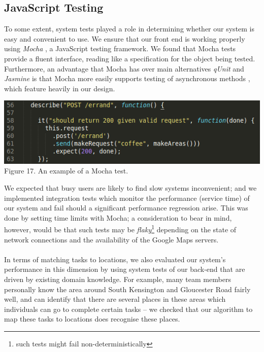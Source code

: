 \documentclass[a4paper, 10pt]{report}
\begin{document}
\subsection{JavaScript Testing}
To some extent, system tests played a role in determining whether our system is easy and convenient to use. We ensure that our front end is working properly using \textit{Mocha} \cite{mocha}, a JavaScript testing framework. We found that Mocha tests provide a fluent interface, reading like a specification for the object being tested. Furthermore, an advantage that Mocha has over main alternatives \textit{qUnit} \cite{qunit} and \textit{Jasmine} \cite{jasmine} is that Mocha more easily supports testing of asynchronous methods \cite{js-test-comp}, which feature heavily in our design.
\begin{center}
\includegraphics[scale=0.45]{mocha_test.png} \\
Figure 17. An example of a Mocha test.
\end{center}
We expected that busy users are likely to find slow systems inconvenient; and we implemented integration tests which monitor the performance (service time) of our system and fail should a significant performance regression arise. This was done by setting time limits with Mocha; a consideration to bear in mind, however, would be that such tests may be \textit{flaky}\footnote{such tests might fail non-deterministically} depending on the state of network connections and the availability of the Google Maps servers. \\\\
In terms of matching tasks to locations, we also evaluated our system's performance in this dimension by using system tests of our back-end that are driven by existing domain knowledge. For example, many team members personally know the area around South Kensington and Gloucester Road fairly well, and can identify that there are several places in these areas which individuals can go to complete certain tasks -- we checked that our algorithm to map these tasks to locations does recognise these places. 
\end{document}
